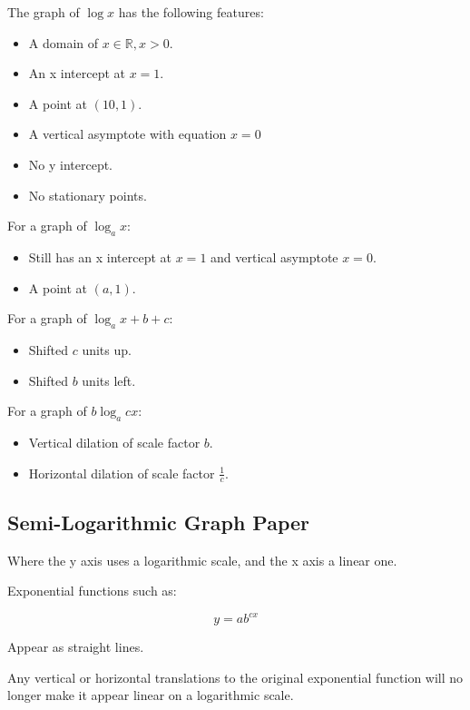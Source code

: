 \documentclass[a4paper,11pt]{article}
\begin{document}
The graph of $\log{x}$ has the following features:

\begin{itemize}
\item A domain of $x \in \mathbb{R}, x > 0$.
\item An x intercept at $x = 1$.
\item A point at $(10, 1)$.
\item A vertical asymptote with equation $x = 0$
\item No y intercept.
\item No stationary points.
\end{itemize}

For a graph of $\log_a{x}$:

\begin{itemize}
\item Still has an x intercept at $x = 1$ and vertical asymptote $x = 0$.
\item A point at $(a, 1)$.
\end{itemize}

For a graph of $\log_a{x + b} + c$:

\begin{itemize}
\item Shifted $c$ units up.
\item Shifted $b$ units left.
\end{itemize}

For a graph of $b \log_a{cx}$:

\begin{itemize}
\item Vertical dilation of scale factor $b$.
\item Horizontal dilation of scale factor $\frac{1}{c}$.
\end{itemize}


\subsection{Semi-Logarithmic Graph Paper}

Where the y axis uses a logarithmic scale, and the x axis a linear one.

Exponential functions such as:

$$
y = ab^{cx}
$$

Appear as straight lines.

Any vertical or horizontal translations to the original exponential function
will no longer make it appear linear on a logarithmic scale.
\end{document}
